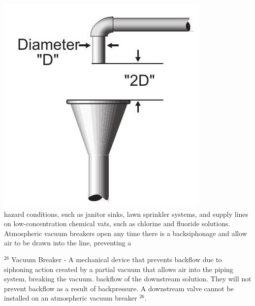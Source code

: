 \documentclass[10pt]{article}
\begin{document}
\includegraphics[max width=\textwidth]{AirGap}\\
hazard conditions, such as janitor sinks, lawn sprinkler systems, and supply lines on low-concentration chemical vats, such as chlorine and fluoride solutions. Atmospheric vacuum breakers open any time there is a backsiphonage and allow air to be drawn into the line, preventing a

${ }^{26}$ Vacuum Breaker - A mechanical device that prevents backflow due to siphoning action created by a partial vacuum that allows air into the piping system, breaking the vacuum. backflow of the downstream solution. They will not prevent backflow as a result of backpressure. A downstream valve cannot be installed on an atmospheric vacuum breaker ${ }^{26}$.
\end{document}
